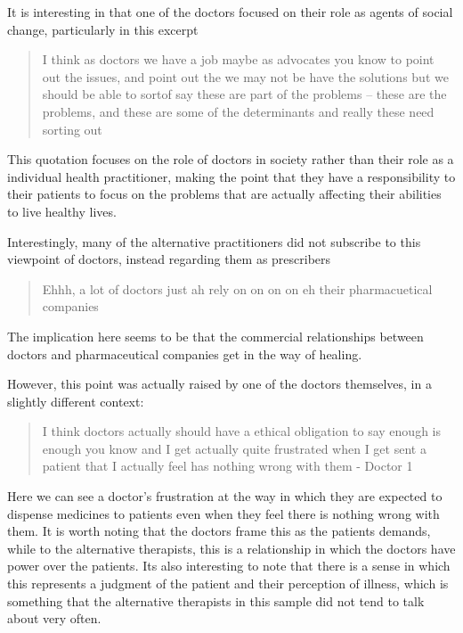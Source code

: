 It is interesting in that one of the doctors focused on their role as agents of social change, particularly in this excerpt

\begin{quotation}
   I think as doctors we have a job maybe as advocates you know to point out the issues, and point out the we may not be have the solutions but we should be able to sortof say these are part of the problems – these are the problems, and these are some of the determinants and really these need sorting out 

\end{quotation}

This quotation focuses on the role of doctors in society rather than their role as a individual health practitioner, making the point that they have a responsibility to their patients to focus on the problems that are actually affecting their abilities to live healthy lives. 

Interestingly, many of the alternative practitioners did not subscribe to this viewpoint of doctors, instead regarding them as prescribers 
\begin{quotation}
  Ehhh, a lot of doctors just ah rely on on on on eh their pharmacuetical companies 

\end{quotation}


The implication here seems to be that the commercial relationships between doctors and pharmaceutical companies get in the way of healing. 

However, this point was actually raised by one of the doctors themselves, in a slightly different context: 

\begin{quotation}
  I think doctors actually should have a ethical obligation to say enough is enough you know and I get actually quite frustrated when I get sent a patient that I actually feel has nothing wrong with them - Doctor 1

\end{quotation}

Here we can see a doctor's frustration at the way in which they are expected to dispense medicines to patients even when they feel there is nothing wrong with them. It is worth noting that the doctors frame this as the patients demands, while to the alternative therapists, this is a relationship in which the doctors have power over the patients. Its also interesting to note that there is  a sense in which this represents a judgment of the patient and their perception of illness, which is something that the alternative therapists in this sample did not tend to talk about very often. 

